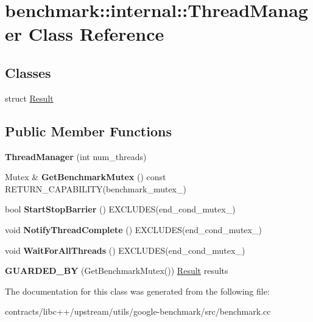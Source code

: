 \hypertarget{classbenchmark_1_1internal_1_1_thread_manager}{}\section{benchmark\+:\+:internal\+:\+:Thread\+Manager Class Reference}
\label{classbenchmark_1_1internal_1_1_thread_manager}
\subsection*{Classes}
\begin{DoxyCompactItemize}
\item 
struct \mbox{\hyperlink{structbenchmark_1_1internal_1_1_thread_manager_1_1_result}{Result}}
\end{DoxyCompactItemize}
\subsection*{Public Member Functions}
\begin{DoxyCompactItemize}
\item 
\mbox{\label{classbenchmark_1_1internal_1_1_thread_manager_a3699661a7fee9373aac160386cc2bc47}} 
{\bfseries Thread\+Manager} (int num\+\_\+threads)
\item 
\mbox{\label{classbenchmark_1_1internal_1_1_thread_manager_af16d4642aff6ce06140e117ccad36445}} 
Mutex \& {\bfseries Get\+Benchmark\+Mutex} () const R\+E\+T\+U\+R\+N\+\_\+\+C\+A\+P\+A\+B\+I\+L\+I\+TY(benchmark\+\_\+mutex\+\_\+)
\item 
\mbox{\label{classbenchmark_1_1internal_1_1_thread_manager_ac39b0a812ebe163a1da00432772eec34}} 
bool {\bfseries Start\+Stop\+Barrier} () E\+X\+C\+L\+U\+D\+ES(end\+\_\+cond\+\_\+mutex\+\_\+)
\item 
\mbox{\label{classbenchmark_1_1internal_1_1_thread_manager_ab13e9ef3258f0ef94f028aabf09553a9}} 
void {\bfseries Notify\+Thread\+Complete} () E\+X\+C\+L\+U\+D\+ES(end\+\_\+cond\+\_\+mutex\+\_\+)
\item 
\mbox{\label{classbenchmark_1_1internal_1_1_thread_manager_af11aa4af6c429a16c48e0d76e6147d0d}} 
void {\bfseries Wait\+For\+All\+Threads} () E\+X\+C\+L\+U\+D\+ES(end\+\_\+cond\+\_\+mutex\+\_\+)
\item 
\mbox{\label{classbenchmark_1_1internal_1_1_thread_manager_a4083b77f2e54a237548cdb7f65015818}} 
{\bfseries G\+U\+A\+R\+D\+E\+D\+\_\+\+BY} (Get\+Benchmark\+Mutex()) \mbox{\hyperlink{structbenchmark_1_1internal_1_1_thread_manager_1_1_result}{Result}} results
\end{DoxyCompactItemize}


The documentation for this class was generated from the following file\+:\begin{DoxyCompactItemize}
\item 
contracts/libc++/upstream/utils/google-\/benchmark/src/benchmark.\+cc\end{DoxyCompactItemize}
